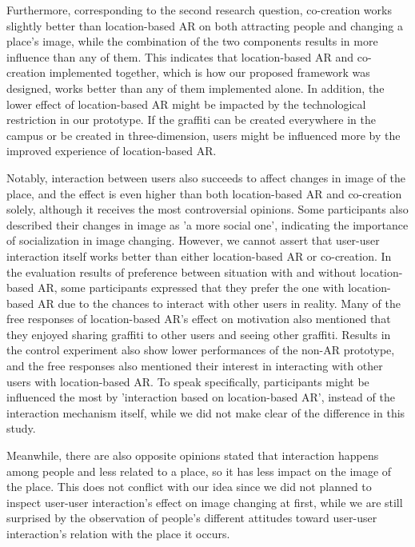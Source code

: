 Furthermore, corresponding to the second research question, co-creation works slightly better than location-based AR on both attracting people and changing a place's image, while the combination of the two components results in more influence than any of them.
This indicates that location-based AR and co-creation implemented together, which is how our proposed framework was designed, works better than any of them implemented alone.
In addition, the lower effect of location-based AR might be impacted by the technological restriction in our prototype. If the graffiti can be created everywhere in the campus or be created in three-dimension, users might be influenced more by the improved experience of location-based AR.

Notably, interaction between users also succeeds to affect changes in image of the place, and the effect is even higher than both location-based AR and co-creation solely, although it receives the most controversial opinions.
Some participants also described their changes in image as 'a more social one', indicating the importance of socialization in image changing.
However, we cannot assert that user-user interaction itself works better than either location-based AR or co-creation.
In the evaluation results of preference between situation with and without location-based AR, some participants expressed that they prefer the one with location-based AR due to the chances to interact with other users in reality.
Many of the free responses of location-based AR's effect on motivation also mentioned that they enjoyed sharing graffiti to other users and seeing other graffiti. 
Results in the control experiment also show lower performances of the non-AR prototype, and the free responses also mentioned their interest in interacting with other users with location-based AR.
To speak specifically, participants might be influenced the most by 'interaction based on location-based AR', instead of the interaction mechanism itself, while we did not make clear of the difference in this study.

Meanwhile, there are also opposite opinions stated that interaction happens among people and less related to a place, so it has less impact on the image of the place.
This does not conflict with our idea since we did not planned to inspect user-user interaction's effect on image changing at first, while we are still surprised by the observation of people's different attitudes toward user-user interaction's relation with the place it occurs.

